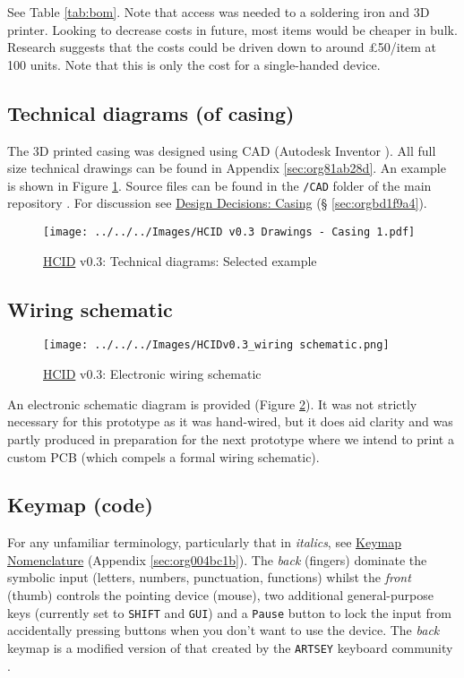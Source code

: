\documentclass[logo,bsc,singlespacing,parskip]{infthesis}
\begin{document}
See Table \ref{tab:bom}.
Note that access was needed to a soldering iron and 3D printer.
Looking to decrease costs in future, most items would be cheaper in bulk.
Research suggests that the costs could be driven down to around £50/item at 100 units.
Note that this is only the cost for a single-handed device.
\subsection{Technical diagrams (of casing)}
\label{sec:orgd1e9c26}
The 3D printed casing was designed using CAD (Autodesk Inventor \autocite{InventorSoftwareGet}).
All full size technical drawings can be found in Appendix \ref{sec:org81ab28d}.
An example is shown in Figure \ref{fig:tech_draw_ex}.
Source files can be found in the \texttt{/CAD} folder of the main repository \autocite{sharpNazzacodeHCIDMy}.
For discussion see \hyperref[sec:orgbd1f9a4]{Design Decisions: Casing} (§ \ref{sec:orgbd1f9a4}).

\begin{figure}[h]
\centering
\texttt{[image: ../../../Images/HCID v0.3 Drawings - Casing 1.pdf]}
\caption{\label{fig:tech_draw_ex}\hyperref[org917851e]{HCID} v0.3: Technical diagrams: Selected example}
\end{figure}
\subsection{Wiring schematic}
\label{sec:org632fc9c}
\begin{figure}[h]
\centering
\texttt{[image: ../../../Images/HCIDv0.3\_wiring schematic.png]}
\caption{\label{fig:wiring_schematic}\hyperref[org917851e]{HCID} v0.3: Electronic wiring schematic}
\end{figure}

An electronic schematic diagram is provided (Figure \ref{fig:wiring_schematic}).
It was not strictly necessary for this prototype as it was hand-wired, but it does aid clarity and was partly produced in preparation for the next prototype where we intend to print a custom PCB (which compels a formal wiring schematic).
\subsection{Keymap (code)}
\label{sec:orgc4a5830}
For any unfamiliar terminology, particularly that in \emph{italics}, see \hyperref[sec:org004bc1b]{Keymap Nomenclature} (Appendix \ref{sec:org004bc1b}).
The \emph{back} (fingers) dominate the symbolic input (letters, numbers, punctuation, functions) whilst the \emph{front} (thumb) controls the pointing device (mouse), two additional general-purpose keys (currently set to \texttt{SHIFT} and \texttt{GUI}) and a \texttt{Pause} button to lock the input from accidentally pressing buttons when you don't want to use the device.
The \emph{back} keymap is a modified version of that created by the \texttt{ARTSEY} keyboard community \autocite{ARTSEYEasyFast}.
\end{document}
